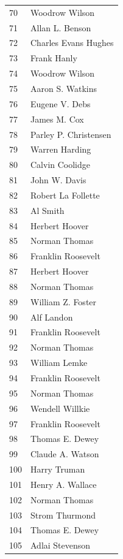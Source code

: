 \documentclass[
  letterpaper,
  DIV=11,
  numbers=noendperiod]{scrreprt}
\begin{document}
\begin{tabular}{ll}
70  &          Woodrow Wilson \\
71  &         Allan L. Benson \\
72  &    Charles Evans Hughes \\
73  &             Frank Hanly \\
74  &          Woodrow Wilson \\
75  &        Aaron S. Watkins \\
76  &          Eugene V. Debs \\
77  &            James M. Cox \\
78  &   Parley P. Christensen \\
79  &          Warren Harding \\
80  &         Calvin Coolidge \\
81  &           John W. Davis \\
82  &      Robert La Follette \\
83  &                Al Smith \\
84  &          Herbert Hoover \\
85  &           Norman Thomas \\
86  &      Franklin Roosevelt \\
87  &          Herbert Hoover \\
88  &           Norman Thomas \\
89  &       William Z. Foster \\
90  &              Alf Landon \\
91  &      Franklin Roosevelt \\
92  &           Norman Thomas \\
93  &           William Lemke \\
94  &      Franklin Roosevelt \\
95  &           Norman Thomas \\
96  &         Wendell Willkie \\
97  &      Franklin Roosevelt \\
98  &         Thomas E. Dewey \\
99  &        Claude A. Watson \\
100 &            Harry Truman \\
101 &        Henry A. Wallace \\
102 &           Norman Thomas \\
103 &          Strom Thurmond \\
104 &         Thomas E. Dewey \\
105 &         Adlai Stevenson \\

\end{tabular}
\end{document}
